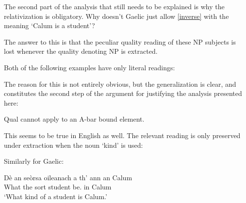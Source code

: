 \documentclass[output=paper]{langsci/langscibook}
\begin{document}
The second part of the analysis that still needs to be explained is why the relativization is obligatory. Why doesn't Gaelic just allow \eqref{inverse} with the meaning `Calum is a student'?

The answer to this is that the peculiar quality reading of these NP subjects is lost whenever the quality denoting NP is extracted.

Both of the following examples have only literal readings:

\ea {}
\z

\ea {}
\z
The reason for this is not entirely obvious, but the generalization is clear,
and constitutes the second step of the argument for justifying the analysis
presented here:

\ea \label{noqual} Qual cannot apply to an A-bar bound element.\z

This seems to be true in English as well.  The relevant reading is only preserved under extraction when the noun `kind' is used:

\ea
    \z
\z

Similarly for Gaelic:


\ea {}
    \gll D\`e an se\`orsa oileanach a th' {ann an} Calum\\
        What the sort student \Rel{} be.\Prs{} in Calum\\
    \glt \enquote*{What kind of a student is Calum.}
\z

\ea {}
\z
\end{document}
